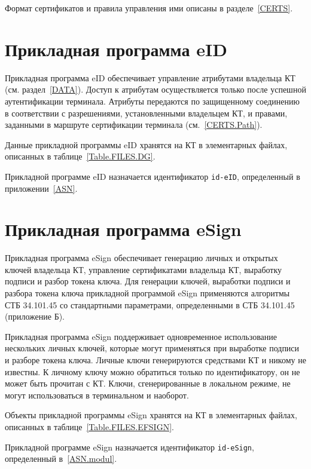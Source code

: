 
Формат сертификатов и правила управления ими описаны в разделе~\ref{CERTS}.

\section{Прикладная программа eID}\label{OBJ.eID}

Прикладная программа eID обеспечивает управление атрибутами владельца КТ 
(см. раздел~\ref{DATA}). Доступ к атрибутам 
осуществляется только после успешной аутентификации терминала. Атрибуты 
передаются по защищенному соединению в соответствии с разрешениями, 
установленными владельцем КТ, и правами, заданными в маршруте сертификации 
терминала (см.~\ref{CERTS.Path}).  

Данные прикладной программы eID хранятся на КТ в 
элементарных файлах, описанных в таблице~\ref{Table.FILES.DG}.


Прикладной программе eID назначается идентификатор \verb|id-eID|, 
определенный в приложении~\ref{ASN}. 

\section{Прикладная программа eSign}\label{OBJ.eSign}

Прикладная программа eSign обеспечивает генерацию личных и открытых 
ключей владельца КТ, управление сертификатами владельца КТ, 
выработку подписи и разбор токена ключа.
Для генерации ключей, выработки подписи и разбора токена ключа
прикладной программой eSign
применяются алгоритмы СТБ 34.101.45 со стандартными параметрами,
определенными в СТБ 34.101.45 (приложение Б).


Прикладная программа eSign поддерживает одновременное 
использование нескольких личных ключей, 
которые могут применяться при выработке подписи и разборе токена ключа.
Личные ключи генерируются средствами КТ и никому не известны. 
К личному ключу можно обратиться только по идентификатору, 
он не может быть прочитан с КТ. 
Ключи, сгенерированные в локальном режиме, не могут использоваться 
в терминальном и наоборот.
\fi

Объекты прикладной программы eSign хранятся на 
КТ в элементарных файлах, описанных 
в таблице~\ref{Table.FILES.EFSIGN}.

Прикладной программе eSign назначается идентификатор \verb|id-eSign|, 
определенный в~\ref{ASN.modul}. 

